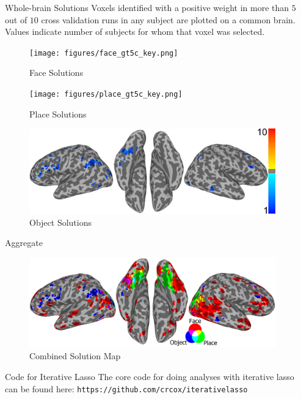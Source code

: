 \documentclass[final]{beamer}
\newlength{\sepwid}
\newlength{\introcolwid}
\begin{document}
\begin{frame}[t]
\begin{columns}[t]
    \begin{column}{\sepwid}\end{column}			%
    \begin{column}{\introcolwid}					  %
		
		\begin{block}{Whole-brain Solutions}
			Voxels identified with a positive weight in more than $5$ out of $10$ cross validation runs in any subject are plotted on a common brain. Values indicate number of subjects for whom that voxel was selected.
			\begin{figure}
				\texttt{[image: figures/face\_gt5c\_key.png]}
				\caption{Face Solutions}
			\end{figure}
			\begin{figure}
				\texttt{[image: figures/place\_gt5c\_key.png]}
				\caption{Place Solutions}
			\end{figure}
			\begin{figure}
				\includegraphics[width=\textwidth]{figures/object_gt5c_key.png}
				\caption{Object Solutions}
			\end{figure}
		\end{block}
		\begin{block}{Aggregate}
			\begin{figure}
				\includegraphics[width=\textwidth]{figures/FPO_gt5b2.png}
				\caption{Combined Solution Map}
			\end{figure}
		\end{block}
		\begin{alertblock}{Code for Iterative Lasso}
			The core code for doing analyses with iterative lasso can be found here:
			\texttt{https://github.com/crcox/iterativelasso}
			

\end{alertblock}
\end{column}
\end{columns}
\end{frame}
\end{document}
